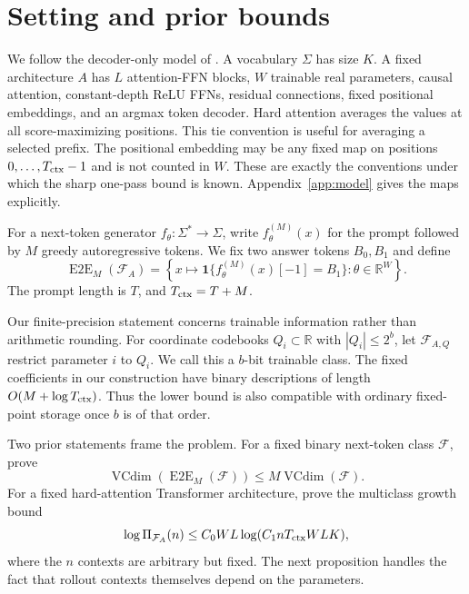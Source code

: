 \documentclass{article}
\newcommand{\R}{\mathbb R}
\newcommand{\1}{\mathbf 1}
\newcommand{\VC}{\operatorname{VCdim}}
\newcommand{\EtoE}{\operatorname{E2E}}
\begin{document}
\section{Setting and prior bounds}

We follow the decoder-only model of \citet{yang2026tight}. A vocabulary $\Sigma$ has size $K$.
A fixed architecture $A$ has $L$ attention-FFN blocks, $W$ trainable real parameters, causal
attention, constant-depth ReLU FFNs, residual connections, fixed positional embeddings, and an
argmax token decoder. Hard attention averages the values at all score-maximizing positions. This
tie convention is useful for averaging a selected prefix. The positional embedding may be any
fixed map on positions $0,\ldots,T_{\rm ctx}-1$ and is not counted in $W$. These are exactly the
conventions under which the sharp one-pass bound is known. Appendix~\ref{app:model} gives the
maps explicitly.

For a next-token generator $f_\theta:\Sigma^*\to\Sigma$, write
$f_\theta^{(M)}(x)$ for the prompt followed by $M$ greedy autoregressive tokens. We fix two answer
tokens $B_0,B_1$ and define
\[
 \EtoE_M(\mathcal F_A)
 =\left\{x\mapsto \1\{f_\theta^{(M)}(x)[-1]=B_1\}:\theta\in\R^W\right\}.
\]
The prompt length is $T$, and $T_{\rm ctx}=T+M$.

Our finite-precision statement concerns trainable information rather than arithmetic rounding.
For coordinate codebooks $Q_i\subset\R$ with $|Q_i|\leq2^b$, let
$\mathcal F_{A,Q}$ restrict parameter $i$ to $Q_i$. We call this a $b$-bit trainable class. The
fixed coefficients in our construction have binary descriptions of length $O(M+\log T_{\rm
ctx})$. Thus the lower bound is also compatible with ordinary fixed-point storage once $b$ is of
that order.

Two prior statements frame the problem. For a fixed binary next-token class $\mathcal F$,
\citet{joshi2025theory} prove
\begin{equation}
 \VC(\EtoE_M(\mathcal F))\leq M\VC(\mathcal F).
 \label{eq:generic-upper}
\end{equation}
For a fixed hard-attention Transformer architecture, \citet{yang2026tight} prove the multiclass
growth bound
\begin{equation}
 \log \Pi_{\mathcal F_A}(n)
 \leq C_0WL\log(C_1nT_{\rm ctx}WLK),
 \label{eq:yang-growth}
\end{equation}
where the $n$ contexts are arbitrary but fixed. The next proposition handles the fact that rollout
contexts themselves depend on the parameters.
\end{document}
